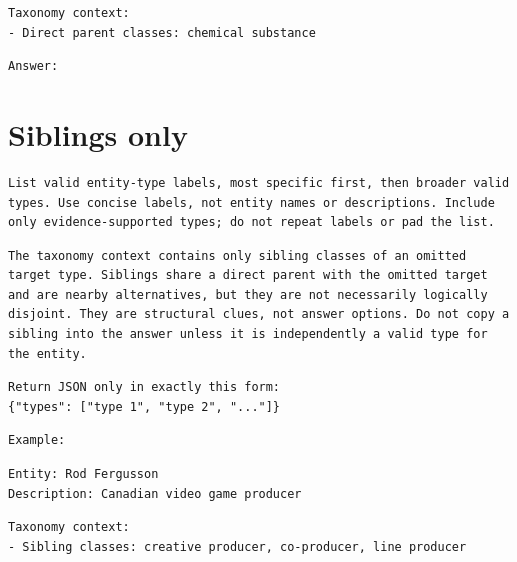 \begin{Verbatim}[fontsize=\footnotesize,breaklines=true,breakanywhere=true]
Taxonomy context:
- Direct parent classes: chemical substance
\end{Verbatim}

\begin{Verbatim}[fontsize=\footnotesize,breaklines=true,breakanywhere=true]
Answer:
\end{Verbatim}

\clearpage

\section{Siblings only}

\begin{Verbatim}[fontsize=\footnotesize,breaklines=true,breakanywhere=true]
List valid entity-type labels, most specific first, then broader valid types. Use concise labels, not entity names or descriptions. Include only evidence-supported types; do not repeat labels or pad the list.
\end{Verbatim}

\begin{Verbatim}[fontsize=\footnotesize,breaklines=true,breakanywhere=true]
The taxonomy context contains only sibling classes of an omitted target type. Siblings share a direct parent with the omitted target and are nearby alternatives, but they are not necessarily logically disjoint. They are structural clues, not answer options. Do not copy a sibling into the answer unless it is independently a valid type for the entity.
\end{Verbatim}

\begin{Verbatim}[fontsize=\footnotesize,breaklines=true,breakanywhere=true]
Return JSON only in exactly this form:
{"types": ["type 1", "type 2", "..."]}
\end{Verbatim}

\begin{Verbatim}[fontsize=\footnotesize,breaklines=true,breakanywhere=true]
Example:
\end{Verbatim}

\begin{Verbatim}[fontsize=\footnotesize,breaklines=true,breakanywhere=true]
Entity: Rod Fergusson
Description: Canadian video game producer
\end{Verbatim}

\begin{Verbatim}[fontsize=\footnotesize,breaklines=true,breakanywhere=true]
Taxonomy context:
- Sibling classes: creative producer, co-producer, line producer
\end{Verbatim}

